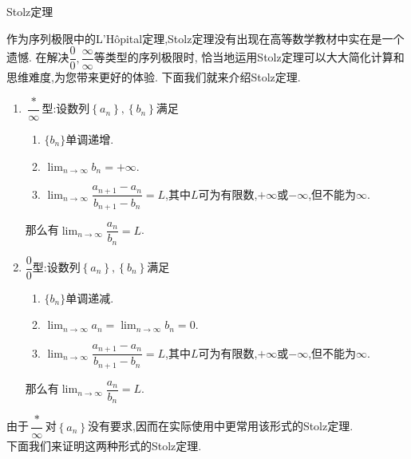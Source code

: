 \documentclass[a4paper]{ctexart}
\begin{document}
\pagestyle{empty}
\begin{center}
    \large Stolz定理
\end{center}
作为序列极限中的L'Hôpital定理,Stolz定理没有出现在高等数学教材中实在是一个遗憾.
在解决$\dfrac{0}{0},\dfrac{\infty}{\infty}$等类型的序列极限时,
恰当地运用Stolz定理可以大大简化计算和思维难度,为您带来更好的体验.
下面我们就来介绍Stolz定理.
\begin{formal}
    \begin{enumerate}[leftmargin=*,label=\textbf{(\arabic*)}]
        \item $\dfrac{*}{\infty}$型:设数列$\left\{a_n\right\},\left\{b_n\right\}$满足
            \begin{enumerate}[leftmargin=*,label=\textbf{(\alph*)}]
                \item $\{b_n\}$单调递增.
                \item $\displaystyle\lim_{n\to\infty}{b_n}=+\infty$.
                \item $\displaystyle\lim_{n\to\infty}{\dfrac{a_{n+1}-a_n}{b_{n+1}-b_n}}=L$,其中$L$可为有限数,$+\infty$或$-\infty$,但不能为$\infty$.
            \end{enumerate}
            那么有$\displaystyle\lim_{n\to\infty}{\dfrac{a_n}{b_n}}=L$.
        \item $\dfrac{0}{0}$型:设数列$\left\{a_n\right\},\left\{b_n\right\}$满足
            \begin{enumerate}[leftmargin=*,label=\textbf{(\alph*)}]
                \item $\{b_n\}$单调递减.
                \item $\displaystyle\lim_{n\to\infty}{a_n}=\lim_{n\to\infty}{b_n}=0$.
                \item $\displaystyle\lim_{n\to\infty}{\dfrac{a_{n+1}-a_n}{b_{n+1}-b_n}}=L$,其中$L$可为有限数,$+\infty$或$-\infty$,但不能为$\infty$.
            \end{enumerate}
            那么有$\displaystyle\lim_{n\to\infty}{\dfrac{a_n}{b_n}}=L$.
    \end{enumerate}
\end{formal}\noindent
由于$\dfrac{*}{\infty}$对$\left\{a_n\right\}$没有要求,因而在实际使用中更常用该形式的Stolz定理.\\
下面我们来证明这两种形式的Stolz定理.
\end{document}
